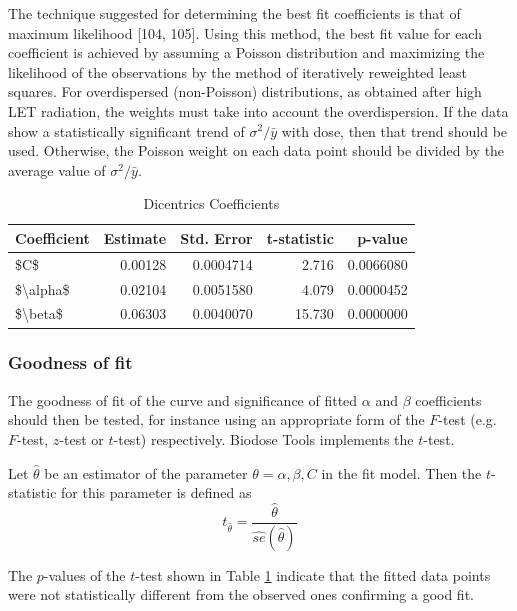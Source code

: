\documentclass[]{scrartcl}
\begin{document}
The technique suggested for determining the best fit coefficients is that of maximum likelihood {[}104, 105{]}. Using this method, the best fit value for each coefficient is achieved by assuming a Poisson distribution and maximizing the likelihood of the observations by the method of iteratively reweighted least squares. For overdispersed (non-Poisson) distributions, as obtained after high LET radiation, the weights must take into account the overdispersion. If the data show a statistically significant trend of \(\sigma^{2}/\bar{y}\) with dose, then that trend should be used. Otherwise, the Poisson weight on each data point should be divided by the average value of \(\sigma^{2}/\bar{y}\).

\begin{table}

\caption{\label{tab:dic-coeffs}Dicentrics Coefficients}
\centering
\begin{tabular}[t]{lrrrr}
\toprule
Coefficient & Estimate & Std. Error & t-statistic & p-value\\
\midrule
\$C\$ & 0.00128 & 0.0004714 & 2.716 & 0.0066080\\
\$\textbackslash{}alpha\$ & 0.02104 & 0.0051580 & 4.079 & 0.0000452\\
\$\textbackslash{}beta\$ & 0.06303 & 0.0040070 & 15.730 & 0.0000000\\
\bottomrule
\end{tabular}
\end{table}

\hypertarget{goodness-of-fit}{%
\subsubsection{Goodness of fit}\label{goodness-of-fit}}

The goodness of fit of the curve and significance of fitted \(\alpha\) and \(\beta\) coefficients should then be tested, for instance using an appropriate form of the \(F\)-test (e.g.~\(F\)-test, \(z\)-test or \(t\)-test) respectively. Biodose Tools implements the \(t\)-test.

Let \(\hat{\theta}\) be an estimator of the parameter \(\theta = \alpha, \beta, C\) in the fit model. Then the \(t\)-statistic for this parameter is defined as
\begin{equation} 
  t_{\hat{\theta}} = \frac{\hat{\theta}}{\widehat{se}(\hat{\theta})}
  \label{eq:t-test}
\end{equation}

The \(p\)-values of the \(t\)-test shown in Table \ref{tab:dic-coeffs} indicate that the fitted data points were not statistically different from the observed ones confirming a good fit.
\end{document}
